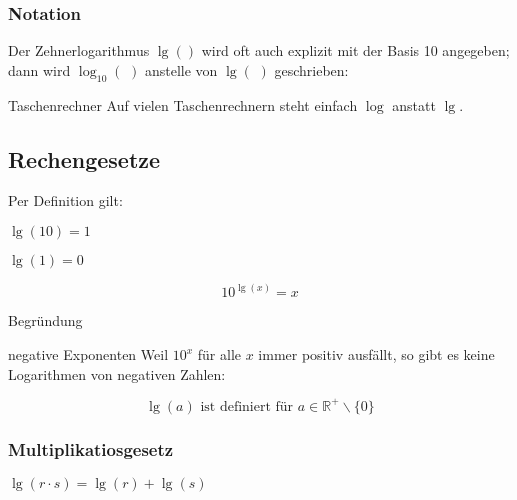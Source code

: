 \subsubsection{Notation}
Der Zehnerlogarithmus $\lg()$ wird oft auch explizit mit der Basis 10
angegeben; dann wird $\log_{10}(\,\,)$ anstelle von $\lg(\,\,)$ geschrieben:

\begin{center}
\end{center}

\begin{bemerkung}{Taschenrechner}{}
  Auf vielen Taschenrechnern steht einfach $\log$ anstatt $\lg$.

  \end{bemerkung}
\newpage

\subsection{Rechengesetze}
Per Definition gilt:

\begin{gesetz}{}{}
$\lg(10) = 1$
\end{gesetz}

\begin{gesetz}{}{}
$\lg(1) = 0$
\end{gesetz}

\begin{gesetz}{}{}
  $$10^{\lg(x)} = x$$
\end{gesetz}
Begründung %

\begin{bemerkung}{negative Exponenten}{}
  Weil $10^x$ für alle $x$ immer positiv ausfällt, so gibt es keine
  Logarithmen von negativen Zahlen:

  $$\lg(a) \textrm{ ist definiert für } a\in\mathbb{R}^+\backslash\{0\}$$
  \end{bemerkung}


\newpage
\subsubsection{Multiplikatiosgesetz}
\begin{gesetz}{}{}
  $\lg(r\cdot s) = \lg(r) + \lg(s)$
\end{gesetz}

